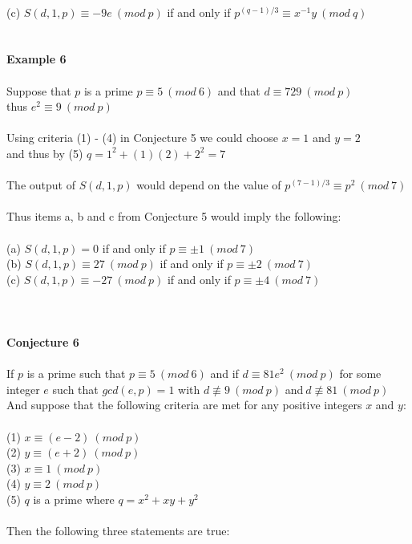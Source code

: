 \documentclass[final,letterpaper,oneside,10pt]{article}
\begin{document}
\\
(c) $S(d,1,p) \equiv -9e~(mod~p)$  if and only if $p^{(q-1)/3} \equiv x^{-1}y~(mod~q)$
\\
\\
\\
\textbf{Example 6}
\\
\\
Suppose that $p$ is a prime $p \equiv 5~(mod~6)$ and that $d \equiv 729~(mod~p)$ 
\\
thus $e^2 \equiv 9~(mod~p)$
\\
\\
Using criteria (1) - (4) in Conjecture 5 we could choose $x=1$ and $y=2$
\\
and thus by (5) $q = 1^2 + (1)(2) + 2^2 = 7$
\\
\\
The output of $S(d,1,p)$ would depend on the value of $p^{(7-1)/3} \equiv p^2~(mod~7)$
\\
\\
Thus items a, b and c from Conjecture 5 would imply the following:
\\
\\
(a) $S(d,1,p) = 0$ if and only if $p \equiv \pm 1~(mod~7)$
\\
(b) $S(d,1,p) \equiv 27~(mod~p)$ if and only if $p \equiv \pm 2~(mod~7)$
\\
(c) $S(d,1,p) \equiv -27~(mod~p)$ if and only if $p \equiv \pm 4~(mod~7)$
\\
\\
\\
\\
\textbf{Conjecture 6}
\\
\\
If $p$ is a prime such that $p \equiv 5~(mod~6)$ and if $d \equiv 81e^2~(mod~p)$ for some integer $e$ such that $gcd(e,p)=1$ with 
$d \not\equiv 9~(mod~p) $ and$~d \not\equiv 81~(mod~p) $
\\
And suppose that the following criteria are met for any positive integers $x$ and $y$:
\\
\\
(1) $x \equiv (e-2)~(mod~p)$
\\
(2) $y \equiv (e+2)~(mod~p)$
\\
(3) $x \equiv 1~(mod~p)$
\\
(4) $y \equiv 2~(mod~p)$
\\
(5) $q$ is a prime where $q = x^2 +xy + y^2$
\\
\\
Then the following three statements are true:
\end{document}
